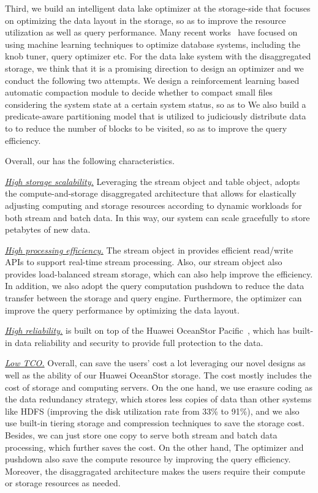 Third,  we build an intelligent data lake optimizer \brain at the storage-side that focuses on optimizing the data layout in the storage, so as to improve the resource utilization as well as  query performance. Many recent works~\cite{ottertune, cdbtune,deepdb,naru}  have focused on using machine learning techniques to  optimize database systems, including the knob tuner, query optimizer etc. For the data lake system with the disaggregated storage, we think that it is a promising direction to design an optimizer and we conduct the following two attempts.
 We design a reinforcement learning based automatic compaction module  to decide whether to compact small files considering the system state at a certain system status, so as to  We also build a predicate-aware partitioning model that is utilized to judiciously distribute data to  to reduce the number of blocks to be visited, so as to improve the query efficiency.  

Overall, our \sys has the following characteristics.

\noindent \underline{\textit{High storage scalability.}} Leveraging the stream object and table object, \sys adopts the compute-and-storage disaggregated architecture that allows for elastically adjusting computing and storage resources according to  dynamic workloads  for both stream and batch data. In this way, our system can  scale gracefully to store petabytes of new data.

\noindent \underline{\textit{High processing efficiency.}} The  stream object in \sys provides efficient read/write APIs to support real-time stream processing. Also, our stream object also provides load-balanced stream storage, which can also help  improve the efficiency. In addition, we also  adopt the query computation pushdown to reduce the data transfer between the storage and query engine. Furthermore, the \brain optimizer can improve the query performance by optimizing the data layout. 

\noindent \underline{\textit{High reliability.}} \sys is built on top of the Huawei OceanStor Pacific~\cite{huawei}, which has built-in data reliability and security to provide full protection to the data.

\noindent \underline{\textit{Low TCO.}} Overall, \sys can save the users' cost a lot leveraging  our novel designs as well as the ability of our Huawei OceanStor storage. The cost mostly includes the cost of  storage and computing servers. 
On the one hand, we use erasure coding as the data redundancy strategy, which stores less copies of data than other systems like HDFS (improving the disk utilization rate from 33\% to 91\%), and we also use built-in tiering storage and  compression techniques to save the storage cost. Besides, we can just store one copy to serve both  stream and batch data processing, which  further saves the cost.
On the other hand,  The \brain optimizer and  pushdown also  save the compute resource by improving the query efficiency. Moreover, the disaggragated architecture makes the users require their compute or storage resources as needed. 


